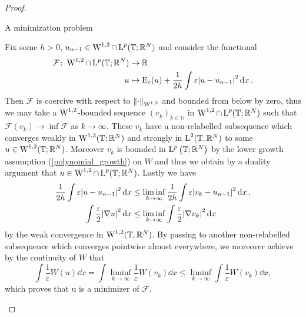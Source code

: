 \begin{proof}
	\begin{description}[wide=0pt]
		\item[Step 1:] A minimization problem
		
		Fix some $ h > 0 $, $ u_{ n - 1 } \in \operatorname{W}^{1 , 2 }\cap \operatorname{L}^{ p } ( \operatorname{\mathbb{T}}; \mathbb{ R }^{ N } ) $ and consider the functional
		\begin{align}
			\label{de_giorgi_min_functional}
			\mathcal{ F } \colon \operatorname{W}^{ 1, 2 } \cap \operatorname{L}^{ p } ( \operatorname{\mathbb{T}} ; \mathbb{ R }^{ N } )
			& \to
			\mathbb{ R }
			\\
			u & \mapsto 
			\operatorname{E}_{ \varepsilon } ( u ) + 
			\frac{ 1 }{ 2h } \int \varepsilon \abs{ u - u_{ n - 1 } }^{ 2 } \dd{x }
			\notag .
		\end{align}
		Then $ \mathcal{ F } $ is coercive with respect to 
		$ \norm{ \cdot }_{ \operatorname{W}^{ 1, 2 } } $ 
		and bounded from below by zero, thus we may take a $ \operatorname{W}^{ 1 , 2 } $-bounded sequence  
		$ (v_{ k } )_{ k \in \mathbb{ N } } $ in $ \operatorname{W}^{ 1 , 2} \cap \operatorname{L}^{ p } ( \operatorname{\mathbb{T}} ; \mathbb{ R }^{ N } ) $ such that 
		$ \mathcal{ F } ( v_{ k } ) \to \inf \mathcal{ F } $ as $ k \to \infty $. 
		These $ v_{ k } $ have a non-relabelled subsequence which converges weakly in $ \operatorname{W}^{ 1 , 2 } ( \operatorname{\mathbb{T}} ; \mathbb{ R }^{ N } ) $ and strongly in $ \operatorname{L}^{ 2 } ( \operatorname{\mathbb{T}}, \mathbb{ R }^{ N } ) $ to some $ u \in \operatorname{W}^{ 1, 2 } ( \operatorname{\mathbb{T}}; \mathbb{ R }^{ N } ) $.
		Moreover $ v_{ k } $ is bounded in $ \operatorname{L}^{ p } \left( \operatorname{\mathbb{T}} ; \mathbb{ R }^{ N } \right)$ by the lower growth assumption (\ref{polynomial_growth}) on $ W $
		and thus we obtain by a duality argument that $ u \in \operatorname{W}^{ 1 , 2 } 
		\cap \operatorname{L}^{ p } ( \operatorname{\mathbb{T}} ; \mathbb{ R }^{ N } ) $.
		Lastly we have 
		\begin{align*}
			\frac{ 1 }{ 2 h }
			\int \varepsilon \abs{ u - u_{ n - 1 } }^{ 2 } \dd{ x}
			& \leq
			\liminf_{ k \to \infty }
			\frac{ 1 }{ 2h }
			\int \varepsilon \abs{ v_{ k } - u_{ n -1 } }^{ 2 } \dd{ x },
			\\
			\int \frac{ \varepsilon }{ 2 } \abs{ \nabla u }^{ 2 } \dd{ x }
			& \leq
			\liminf_{ k \to \infty }
			\int \frac{ \varepsilon }{ 2 } \abs{ \nabla v_{ k } }^{ 2 } \dd{ x }
		\end{align*}
		by the weak convergence in $ \operatorname{W}^{ 1 , 2 } ( \operatorname{\mathbb{T}} , \mathbb{ R }^{ N } )$.
		By passing to another non-relabelled subsequence which converges 
		pointwise almost everywhere, we moreover achieve by the continuity of $ 
		W $ that
		\begin{equation*}
			\int \frac{ 1 }{ \varepsilon } W ( u ) \dd{ x }
			=
			\int \liminf_{ k \to \infty } \frac{ 1 }{ \varepsilon } W ( v_{k } ) \dd{ x }
			\leq
			\liminf_{ k \to \infty } \int \frac{ 1 }{ \varepsilon } W ( v_{ k } ) \dd{x},
		\end{equation*}
		which proves that u is a minimizer of $ \mathcal{ F } $.
		

\end{description}
\end{proof}
